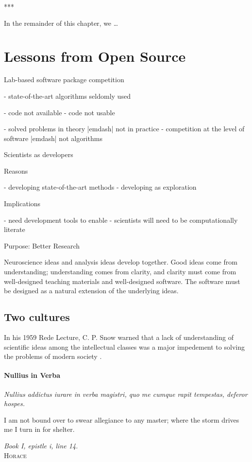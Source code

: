 \documentclass[ChapterTOCs,krantz2]{krantz} %
\newcommand{\parasep}{\begin{center}*\hspace{6em}*\hspace{6em}*\end{center}}
\begin{document}
\parasep

In the remainder of this chapter, we \ldots

\section{Lessons from Open Source}

Lab-based software package competition

- state-of-the-art algorithms seldomly used

  - code not available
  - code not usable

- solved problems in theory |emdash| not in practice
- competition at the level of software |emdash| not algorithms

Scientists as developers

Reasons

- developing state-of-the-art methods
- developing as exploration

Implications

- need development tools to enable
- scientists will need to be computationally literate

Purpose:  Better Research

Neuroscience ideas and analysis ideas develop together. Good
ideas come from understanding; understanding comes from clarity, and clarity
must come from well-designed teaching materials and well-designed software. The
software must be designed as a natural extension of the underlying ideas.


\subsection{Two cultures}

In his 1959 Rede Lecture, C. P. Snow warned that a lack of understanding
of scientific ideas among the intellectual classes was a major
impedement to solving the problems of modern society \cite{snow1960two}.

\paragraph{ {\bf Nullius in Verba}} 

\setlength{\epigraphrule}{0pt}
\setlength{\epigraphwidth}{.65\textwidth}
\epigraph%
{%
  \emph{Nullius addictus iurare in verba magistri,
  quo me cumque rapit tempestas, deferor hospes.}

  I am not bound over to swear allegiance to any master; where the storm
  drives me I turn in for shelter.
}%
{\textit{Book I, epistle i, line 14.}\\ \textsc{Horace} }
\end{document}
